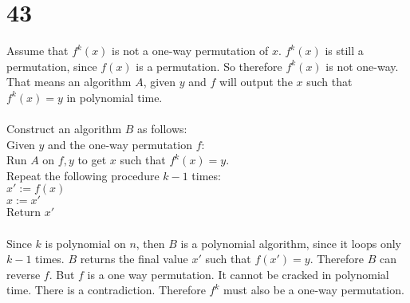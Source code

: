 \documentclass[letterpaper,notitlepage,twoside]{article}
\newcommand\tab[1][1cm]{\hspace*{#1}} %
\begin{document}
\section*{43}
Assume that $f^k(x)$ is not a one-way permutation of $x$. $f^k(x)$ is still a permutation, since $f(x)$ is a permutation. So therefore $f^k(x)$ is not one-way. That means an algorithm $A$, given $y$ and $f$ will output the $x$ such that $f^k(x) = y$ in polynomial time. \\\\
Construct an algorithm $B$ as follows: \\
Given $y$ and the one-way permutation $f$: \\
\tab Run $A$ on $f, y$ to get $x$ such that $f^k(x) = y$. \\
\tab Repeat the following procedure $k - 1$ times: \\
\tab\tab $x' := f(x)$ \\
\tab\tab $x := x'$ \\
\tab Return $x'$ \\\\
Since $k$ is polynomial on $n$, then $B$ is a polynomial algorithm, since it loops only $k - 1$ times. $B$ returns the final value $x'$ such that $f(x') = y$. Therefore $B$ can reverse $f$. But $f$ is a one way permutation. It cannot be cracked in polynomial time. There is a contradiction. Therefore $f^k$ must also be a one-way permutation.
\end{document}
